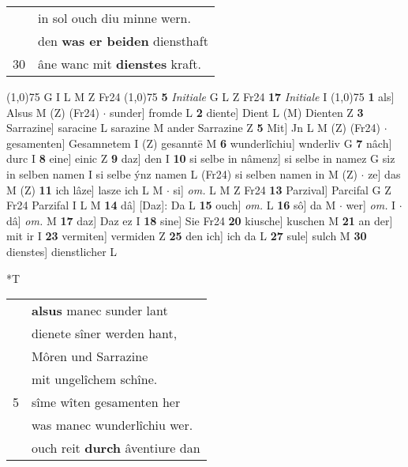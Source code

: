 \documentclass[8pt,a4paper,notitlepage]{article}
\begin{document}
\begin{table}[ht]
\begin{minipage}[t]{0.5\linewidth}
\begin{tabular}{rl}
 & in sol ouch diu minne wern.\\ 
 & den \textbf{was er beiden} diensthaft\\ 
30 & âne wanc mit \textbf{dienstes} kraft.\\ 
\end{tabular}
\scriptsize
\line(1,0){75} \newline
G I L M Z Fr24 \newline
\line(1,0){75} \newline
\textbf{5} \textit{Initiale} G L Z Fr24  \textbf{17} \textit{Initiale} I  \newline
\line(1,0){75} \newline
\textbf{1} als] Alsus M (Z) (Fr24)  $\cdot$ sunder] fromde L \textbf{2} diente] Dient L (M) Dienten Z \textbf{3} Sarrazine] saracine L sarazine M ander Sarrazine Z \textbf{5} Mit] Jn L M (Z) (Fr24)  $\cdot$ gesamenten] Gesamnetem I (Z) gesanntē M \textbf{6} wunderlîchiu] wnderliv G \textbf{7} nâch] durc I \textbf{8} eine] einic Z \textbf{9} daz] den I \textbf{10} si selbe in nâmenz] si selbe in namez G siz in selben namen I si selbe ýnz namen L (Fr24) si selben namen in M (Z)  $\cdot$ ze] das M (Z) \textbf{11} ich lâze] lasze ich L M  $\cdot$ si] \textit{om.} L M Z Fr24 \textbf{13} Parzival] Parcifal G Z Fr24 Parzifal I L M \textbf{14} dâ] [Daz]: Da L \textbf{15} ouch] \textit{om.} L \textbf{16} sô] da M  $\cdot$ wer] \textit{om.} I  $\cdot$ dâ] \textit{om.} M \textbf{17} daz] Daz ez I \textbf{18} sine] Sie Fr24 \textbf{20} kiusche] kuschen M \textbf{21} an der] mit ir I \textbf{23} vermiten] vermiden Z \textbf{25} den ich] ich da L \textbf{27} sule] sulch M \textbf{30} dienstes] dienstlicher L \newline
\end{minipage}
\hspace{0.5cm}
\begin{minipage}[t]{0.5\linewidth}
\small
\begin{center}*T
\end{center}
\begin{tabular}{rl}
 & \textbf{alsus} manec sunder lant\\ 
 & dienete sîner werden hant,\\ 
 & Môren und Sarrazine\\ 
 & mit ungelîchem schîne.\\ 
5 & sîme wîten gesamenten her\\ 
 & was manec wunderlîchiu wer.\\ 
 & ouch reit \textbf{durch} âventiure dan\\ 

\end{tabular}
\end{minipage}
\end{table}
\end{document}
